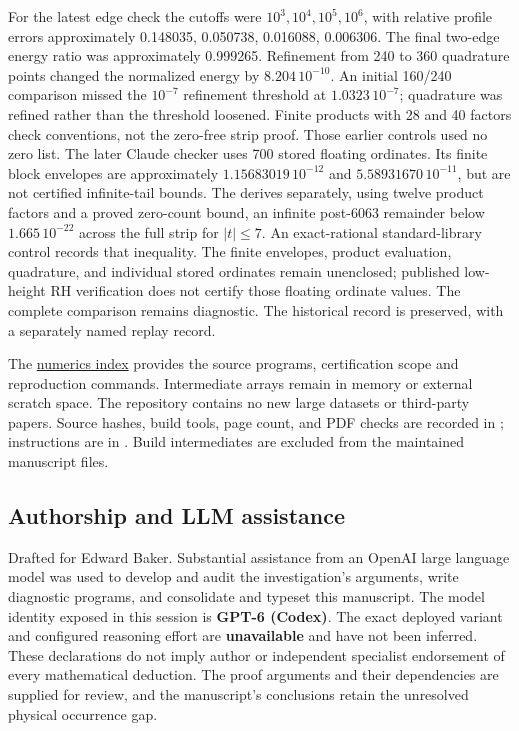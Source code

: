 For the latest edge check the cutoffs were
$10^3,10^4,10^5,10^6$, with relative profile errors
approximately 0.148035, 0.050738, 0.016088, 0.006306.
The final two-edge energy ratio was approximately
0.999265. Refinement from 240 to 360 quadrature points
changed the normalized energy by $8.204\,10^{-10}$.
An initial 160/240 comparison missed the $10^{-7}$
refinement threshold at $1.0323\,10^{-7}$; quadrature
was refined rather than the threshold loosened.
Finite products with 28 and 40 factors check
conventions, not the zero-free strip proof.
Those earlier controls used no zero list. The later Claude
checker uses 700 stored floating ordinates. Its finite block
envelopes are approximately $1.15683019\,10^{-12}$ and
$5.58931670\,10^{-11}$, but are not certified infinite-tail
bounds. The
derives separately, using twelve product factors and a proved
zero-count bound, an infinite post-6063 remainder below
$1.665\,10^{-22}$ across the full strip for $|t|\le7$.
An exact-rational standard-library control records that
inequality. The finite envelopes, product evaluation,
quadrature, and individual stored ordinates remain unenclosed;
published low-height RH verification does not certify those
floating ordinate values. The complete comparison remains
diagnostic. The historical record is preserved, with a
separately named replay record.

The \href{numerics/README.md}{numerics index} provides
the source programs, certification scope and reproduction commands.
Intermediate arrays remain in memory or external
scratch space. The repository contains no new large
datasets or third-party papers. Source hashes, build
tools, page count, and PDF checks are recorded in
; instructions are in
. Build intermediates are excluded
from the maintained manuscript files.

\subsection{Authorship and LLM assistance}
Drafted for Edward Baker. Substantial assistance from
an OpenAI large language model was used to develop
and audit the investigation's arguments, write
diagnostic programs, and consolidate and typeset this
manuscript. The model identity exposed in this session
is \textbf{GPT-6 (Codex)}. The exact deployed variant
and configured reasoning effort are \textbf{unavailable}
and have not been inferred. These declarations do
not imply author or independent specialist endorsement
of every mathematical deduction. The proof arguments
and their dependencies are supplied for review, and
the manuscript's conclusions retain the unresolved
physical occurrence gap.
